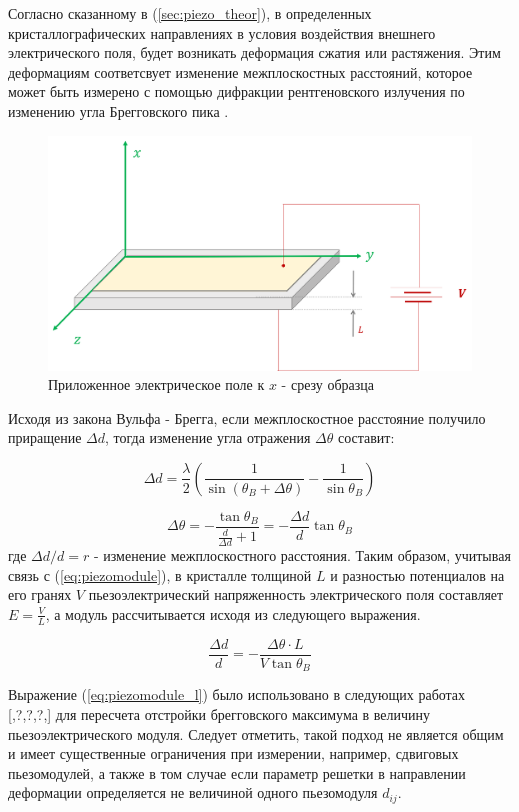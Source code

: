 Согласно сказанному в (\ref{sec:piezo_theor}), в определенных кристаллографических направлениях в
условия воздействия внешнего электрического поля, будет возникать деформация
сжатия или растяжения. Этим деформациям соответсвует изменение межплоскостных
 расстояний, которое может быть измерено с помощью дифракции рентгеновского
 излучения по изменению угла Брегговского пика \cite{marchenkov2014}.

 \begin{figure}[H]
   \centering
   \includegraphics[width=.4\textwidth]{images/piezo.png}
   \caption{Приложенное электрическое поле к $x$ - срезу образца}
   \label{ris:x_cut}
 \end{figure}

Исходя из закона Вульфа - Брегга, если межплоскостное расстояние получило приращение
$\Delta d$, тогда изменение угла отражения $\Delta \theta$ составит:

$$ \Delta d = \frac{\lambda}{2}\left( \frac{1}{\sin(\theta_B + \Delta \theta) } - \frac{1}{\sin \theta_B } \right) $$

\begin{equation}
   \Delta \theta =-  \frac{\tan \theta_B}{\frac{d}{\Delta d}+1}  = -  \frac{\Delta d }{d}  \tan \theta_B
\end{equation}
где $\Delta d/d = r$ - изменение межплоскостного расстояния. Таким образом, учитывая связь с
(\ref{eq:piezomodule}),  в кристалле толщиной $L$ и разностью потенциалов на его
гранях $V$ пьезоэлектрический
напряженность электрического поля составляет $E = \frac{V}{L}$, а модуль
 рассчитывается исходя из следующего выражения.

 \begin{equation}
    \frac{\Delta d}{d}  = -\frac{\Delta \theta \cdot L}{V \tan \theta_B}
    \label{eq:piezomodule_l}
 \end{equation}

Выражение (\ref{eq:piezomodule_l}) было использовано в следующих работах [,?,?,?,] для
пересчета отстройки брегговского максимума в величину пьезоэлектрического модуля.
Следует отметить, такой подход не является общим и имеет существенные ограничения при
измерении, например, сдвиговых пьезомодулей, а также в том случае если параметр решетки
в направлении деформации определяется не величиной одного пьезомодуля $d_{ij}$.

